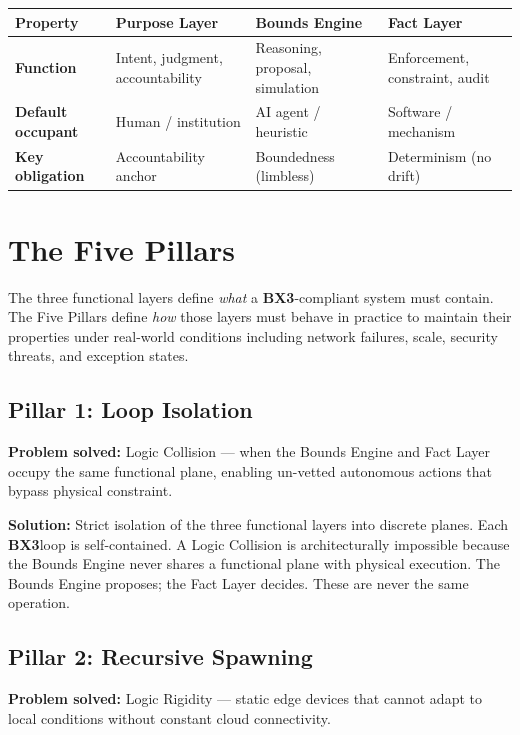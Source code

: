 \documentclass[12pt]{article}
\newcommand{\bxthree}{\textbf{BX3}}
\begin{document}
\begin{center}
\begin{tabular}{>{\bfseries}p{2.8cm} p{3.2cm} p{3.2cm} p{4.5cm}}
\toprule
\textbf{Property} & \textbf{Purpose Layer} & \textbf{Bounds Engine} & \textbf{Fact Layer} \\
\midrule
Function & Intent, judgment, accountability & Reasoning, proposal, simulation & Enforcement, constraint, audit \\
Default occupant & Human / institution & AI agent / heuristic & Software / mechanism \\
Key obligation & Accountability anchor & Boundedness (limbless) & Determinism (no drift) \\
\bottomrule
\end{tabular}
\end{center}

\section{The Five Pillars}
\label{sec:pillars}

The three functional layers define \textit{what} a \bxthree-compliant system must contain. The Five Pillars define \textit{how} those layers must behave in practice to maintain their properties under real-world conditions including network failures, scale, security threats, and exception states.

\subsection{Pillar 1: Loop Isolation}
\textbf{Problem solved:} Logic Collision --- when the Bounds Engine and Fact Layer occupy the same functional plane, enabling un-vetted autonomous actions that bypass physical constraint.

\textbf{Solution:} Strict isolation of the three functional layers into discrete planes. Each \bxthree loop is self-contained. A Logic Collision is architecturally impossible because the Bounds Engine never shares a functional plane with physical execution. The Bounds Engine proposes; the Fact Layer decides. These are never the same operation.

\subsection{Pillar 2: Recursive Spawning}
\textbf{Problem solved:} Logic Rigidity --- static edge devices that cannot adapt to local conditions without constant cloud connectivity.
\end{document}
